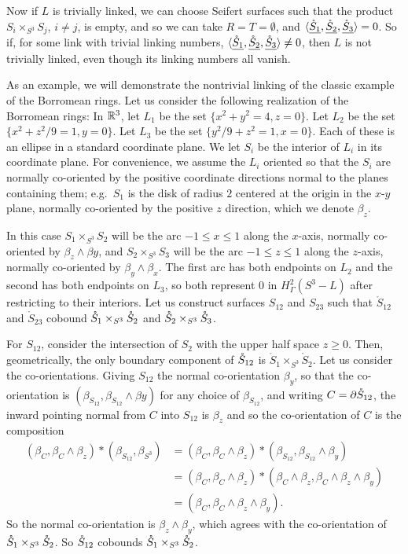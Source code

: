 Now if $L$ is trivially linked, we can choose Seifert surfaces such that the product $S_i \times_{S^3} S_j$, $i \neq j$, is empty, and so we can take $R = T = \emptyset$, and $\langle \underline{\mathring{S}_1}, \underline{\mathring{S}_2}, \underline{\mathring{S}_3}\rangle = 0$.
So if, for some link with trivial linking numbers, $\langle \underline{\mathring{S}_1}, \underline{\mathring{S}_2}, \underline{\mathring{S}_3}\rangle \neq 0$, then $L$ is not trivially linked, even though its linking numbers all vanish.

As an example, we will demonstrate the nontrivial linking of the classic example of the Borromean rings.
Let us consider the following realization of the Borromean rings:
In $\mathbb{R}^3$, let $L_1$ be the set $\{x^2+y^2 = 4, z=0\}$.
Let $L_2$ be the set $\{x^2+z^2/9 = 1, y=0\}$.
Let $L_3$ be the set $\{y^2/9 + z^2 = 1 , x=0\}$.
Each of these is an ellipse in a standard coordinate plane.
We let $S_i$ be the interior of $L_i$ in its coordinate plane.
For convenience, we assume the $L_i$ oriented so that the $S_i$ are normally co-oriented by the positive coordinate directions normal to the planes containing them; e.g.\ $S_1$ is the disk of radius $2$ centered at the origin in the $x$-$y$ plane, normally co-oriented by the positive $z$ direction, which we denote $\beta_z$.

In this case $S_1 \times_{S^3} S_2$ will be the arc $-1 \leq x \leq 1$ along the $x$-axis, normally co-oriented by $\beta_z \wedge \beta y$, and $S_2 \times_{S^3} S_3$ will be the arc $-1 \leq z \leq 1$ along the $z$-axis, normally co-oriented by $\beta_y \wedge \beta_x$.
The first arc has both endpoints on $L_2$ and the second has both endpoints on $L_3$, so both represent $0$ in $H^2_\Gamma(S^3-L)$ after restricting to their interiors.
Let us construct surfaces $S_{12}$ and $S_{23}$ such that $\mathring S_{12}$ and $\mathring S_{23}$  cobound $\mathring{S}_1 \times_{S^3} \mathring{S}_2$ and $\mathring{S}_2 \times_{S^3} \mathring{S}_3$.

For $S_{12}$, consider the intersection of $S_2$ with the upper half space $z \geq 0$.
Then, geometrically, the only boundary component of $\mathring{S}_{12}$ is $\mathring S_1 \times_{S^3} \mathring S_2$.
Let us consider the co-orientations.
Giving $S_{12}$ the normal co-orientation $\beta_y$, so that the co-orientation is $(\beta_{S_{12}}, \beta_{S_{12}} \wedge \beta y)$ for any choice of $\beta_{S_{12}}$, and writing $C = \partial \mathring{S}_{12}$, the inward pointing normal from $C$ into $S_{12}$ is $\beta_z$ and so the co-orientation of $C$ is the composition
\begin{align*}
(\beta_C, \beta_C \wedge \beta_z) * (\beta_{S_{12}}, \beta_{S^3}) &=(\beta_C, \beta_C \wedge \beta_z) * (\beta_{S_{12}}, \beta_{S_{12}} \wedge \beta_y)\\
&=(\beta_C, \beta_C \wedge \beta_z) * (\beta_C \wedge \beta_z, \beta_C \wedge \beta_z\wedge \beta_y)\\
&=(\beta_C,  \beta_C \wedge \beta_z \wedge \beta_y).
\end{align*}
So the normal co-orientation is $\beta_z \wedge \beta_y$, which agrees with the co-orientation of $\mathring{S}_1 \times_{S^3} \mathring{S}_2$.
So $\mathring{S}_{12}$ cobounds $\mathring{S}_1 \times_{S^3} \mathring{S}_2$.

